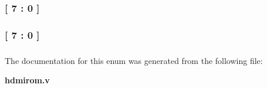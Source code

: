 \subsubsection[{adr}]{ {\bfseries \textcolor{vhdlchar}{[}\textcolor{vhdlchar}{ } \textcolor{vhdldigit}{7} \textcolor{vhdlchar}{ }\textcolor{vhdlchar}{\-:}\textcolor{vhdlchar}{ } \textcolor{vhdldigit}{0} \textcolor{vhdlchar}{ }\textcolor{vhdlchar}{]}\textcolor{vhdlchar}{ }} \hspace{0.3cm}}\label{enum1hdmirom_ab0386a61035060da0e2f727498ac56dc}
\subsubsection[{data}]{ {\bfseries \textcolor{vhdlchar}{[}\textcolor{vhdlchar}{ } \textcolor{vhdldigit}{7} \textcolor{vhdlchar}{ }\textcolor{vhdlchar}{\-:}\textcolor{vhdlchar}{ } \textcolor{vhdldigit}{0} \textcolor{vhdlchar}{ }\textcolor{vhdlchar}{]}\textcolor{vhdlchar}{ }} \hspace{0.3cm}}\label{enum1hdmirom_a036fd5916634737bc1f2bbd41be1d741}
\subsubsection[{data}]{ {\bfseries \textcolor{vhdlchar}{ }} \hspace{0.3cm}}\label{enum1hdmirom_abcf594f9368616cc6677149559f5086d}


The documentation for this enum was generated from the following file\-:\begin{DoxyCompactItemize}
\item 
{\bf hdmirom.\-v}\end{DoxyCompactItemize}

